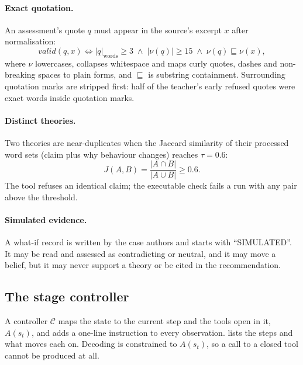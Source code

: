 \paragraph{Exact quotation.} An assessment's quote $q$ must appear in the source's excerpt $x$ after normalisation:
\begin{equation}
  \textit{valid}(q, x) \iff |q|_{\text{words}} \ge 3 \;\wedge\; |\nu(q)| \ge 15 \;\wedge\; \nu(q) \sqsubseteq \nu(x),
\end{equation}
where $\nu$ lowercases, collapses whitespace and maps curly quotes, dashes and non-breaking spaces to plain forms, and
$\sqsubseteq$ is substring containment. Surrounding quotation marks are stripped first: half of the teacher's early
refused quotes were exact words inside quotation marks.

\paragraph{Distinct theories.} Two theories are near-duplicates when the Jaccard similarity of their processed word sets
(claim plus why behaviour changes) reaches $\tau = 0.6$:
\begin{equation}
  J(A,B) = \frac{|A \cap B|}{|A \cup B|} \ge 0.6 .
\end{equation}
The tool refuses an identical claim; the executable check fails a run with any pair above the threshold.

\paragraph{Simulated evidence.} A what-if record is written by the case authors and starts with ``SIMULATED''. It may be
read and assessed as contradicting or neutral, and it may move a belief, but it may never support a theory or be cited
in the recommendation.

\subsection{The stage controller}
A controller $\mathcal{C}$ maps the state to the current step and the tools open in it, $A(s_t)$, and adds a one-line
instruction to every observation.  lists the steps and what moves each on. Decoding is constrained to
$A(s_t)$, so a call to a closed tool cannot be produced at all.

